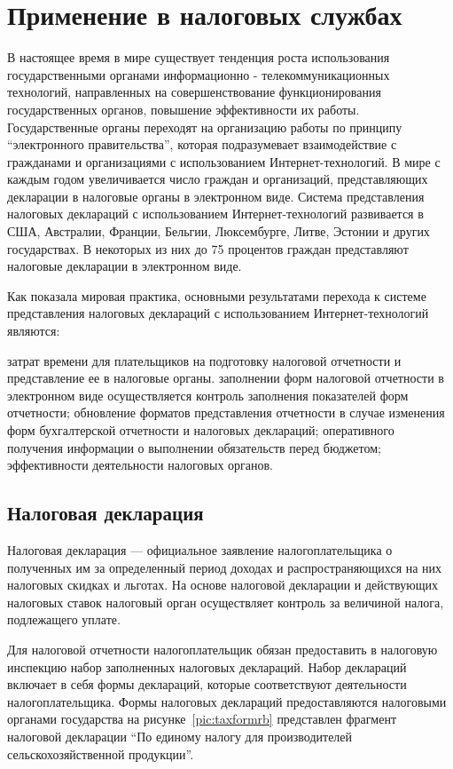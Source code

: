\documentclass[14pt,a4paper]{reportmod}
\begin{document}
\section{Применение в налоговых службах}
В настоящее время в мире существует тенденция роста использования государственными органами информационно - телекоммуникационных технологий, направленных на совершенствование функционирования государственных органов, повышение эффективности их работы. Государственные органы переходят на организацию работы по принципу ``электронного правительства'', которая подразумевает взаимодействие с гражданами и организациями с использованием Интернет-технологий. В мире с каждым годом увеличивается число граждан и организаций, представляющих декларации в налоговые органы в электронном виде. Система представления налоговых деклараций с использованием Интернет-технологий развивается в США, Австралии, Франции, Бельгии, Люксембурге, Литве, Эстонии и других государствах. В некоторых из них до 75 процентов граждан представляют налоговые декларации в электронном виде.

Как показала мировая практика, основными результатами перехода к системе представления налоговых деклараций с использованием Интернет-технологий являются:
\begin{itemize}
   затрат времени для плательщиков на подготовку налоговой отчетности и представление ее в налоговые органы. заполнении форм налоговой отчетности в электронном виде осуществляется контроль заполнения показателей форм отчетности;
   обновление форматов представления отчетности в случае изменения форм бухгалтерской отчетности и налоговых деклараций;
   оперативного получения информации о выполнении обязательств перед бюджетом;
   эффективности деятельности налоговых органов.
\end{itemize}

\subsection{Налоговая декларация}
Налоговая декларация — официальное заявление налогоплательщика о полученных им за определенный период доходах и распространяющихся на них налоговых скидках и льготах. На основе налоговой декларации и действующих налоговых ставок налоговый орган осуществляет контроль за величиной налога, подлежащего уплате.\cite{refwikitaxreturn}

Для налоговой отчетности налогоплательщик обязан предоставить в налоговую инспекцию набор заполненных налоговых деклараций. Набор деклараций включает в себя формы деклараций, которые соответствуют деятельности налогоплательщика. Формы налоговых деклараций предоставляются налоговыми органами государства на рисунке~\ref{pic:taxformrb} представлен фрагмент налоговой декларации ``По единому налогу для производителей сельскохозяйственной продукции''.
\end{document}
